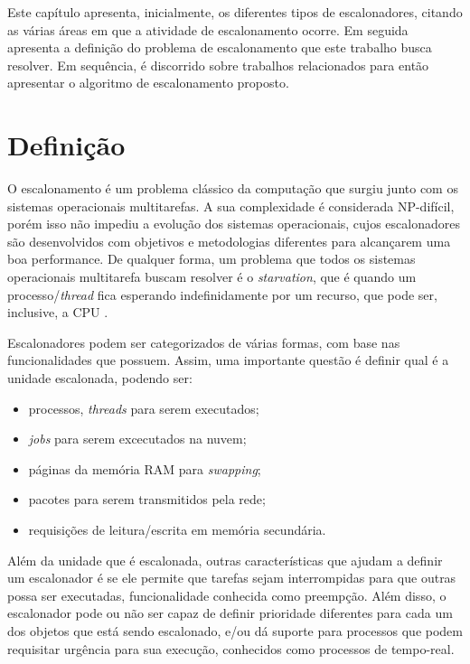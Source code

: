 Este capítulo apresenta, inicialmente, os diferentes tipos de escalonadores, citando as várias áreas em que a atividade de escalonamento ocorre. Em seguida apresenta a definição do problema de escalonamento que este trabalho busca resolver. Em sequência, é discorrido sobre trabalhos relacionados para então apresentar o algoritmo de escalonamento proposto.

\section{Definição}

O escalonamento é um problema clássico da computação que surgiu junto com os sistemas operacionais multitarefas. A sua complexidade é considerada NP-difícil\cite{ULLMAN1975384}, porém isso não impediu a evolução dos sistemas operacionais, cujos escalonadores são desenvolvidos com objetivos e metodologias diferentes para alcançarem uma boa performance. De qualquer forma, um problema que todos os sistemas operacionais multitarefa buscam resolver é o \textit{starvation}, que é quando um processo/\textit{thread} fica esperando indefinidamente por um recurso, que pode ser, inclusive, a \acrshort{CPU} \cite{TANEMBAUM_SO}.

Escalonadores podem ser categorizados de várias formas, com base nas funcionalidades que possuem. Assim, uma importante questão é definir qual é a unidade escalonada, podendo ser\cite{TANEMBAUM_SO}:

	\begin{itemize}
		\item processos, \textit{threads} para serem executados;
		\item \textit{jobs} para serem excecutados na nuvem;
		\item páginas da memória \acrfull{RAM} para \textit{swapping};
		\item pacotes para serem transmitidos pela rede;
		\item requisições de leitura/escrita em memória secundária.
	\end{itemize}

	Além da unidade que é escalonada, outras características que ajudam a definir um escalonador é se ele permite que tarefas sejam interrompidas para que outras possa ser executadas, funcionalidade conhecida como preempção. Além disso, o escalonador pode ou não ser capaz de definir prioridade diferentes para cada um dos objetos que está sendo escalonado, e/ou dá suporte para processos que podem requisitar urgência para sua execução, conhecidos como processos de tempo-real\cite{TANEMBAUM_SO}.

